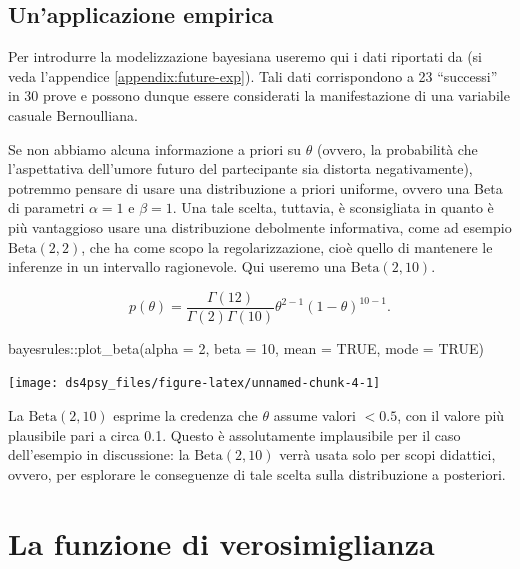 \documentclass[
  11pt,
]{krantz}
\makeatletter
\newenvironment{Shaded}{\begin{snugshade}}{\end{snugshade}}
\newcommand{\AttributeTok}[1]{\textcolor[rgb]{0.61,0.61,0.61}{#1}}
\newcommand{\ConstantTok}[1]{\textcolor[rgb]{0,0,0}{#1}}
\newcommand{\DecValTok}[1]{\textcolor[rgb]{0.06,0.06,0.06}{#1}}
\newcommand{\FunctionTok}[1]{\textcolor[rgb]{0,0,0}{#1}}
\newcommand{\NormalTok}[1]{#1}
\newcommand{\SpecialCharTok}[1]{\textcolor[rgb]{0,0,0}{#1}}
\newenvironment{kframe}{%
\medskip{}
\setlength{\fboxsep}{.8em}
 \def\at@end@of@kframe{}%
 \ifinner\ifhmode%
  \def\at@end@of@kframe{\end{minipage}}%
  \begin{minipage}{\columnwidth}%
 \fi\fi%
 \def\FrameCommand##1{\hskip\@totalleftmargin \hskip-\fboxsep
 \colorbox{shadecolor}{##1}\hskip-\fboxsep
     \hskip-\linewidth \hskip-\@totalleftmargin \hskip\columnwidth}%
 \MakeFramed {\advance\hsize-\width
   \@totalleftmargin\z@ \linewidth\hsize
   \@setminipage}}%
 {\par\unskip\endMakeFramed%
 \at@end@of@kframe}
\renewenvironment{Shaded}{\begin{kframe}}{\end{kframe}}
\theoremstyle{definition}
\theoremstyle{definition}
\theoremstyle{definition}
\theoremstyle{definition}
\theoremstyle{remark}
\makeatother
\begin{document}
\hypertarget{unapplicazione-empirica}{%
\subsection{Un'applicazione empirica}\label{unapplicazione-empirica}}

Per introdurre la modelizzazione bayesiana useremo qui i dati riportati da \citet{zetschefuture2019} (si veda l'appendice \ref{appendix:future-exp}). Tali dati corrispondono a 23 ``successi'' in 30 prove e possono dunque essere considerati la manifestazione di una variabile casuale Bernoulliana.

Se non abbiamo alcuna informazione a priori su \(\theta\) (ovvero, la probabilità che l'aspettativa dell'umore futuro del partecipante sia distorta negativamente), potremmo pensare di usare una distribuzione a priori uniforme, ovvero una Beta di parametri \(\alpha=1\) e \(\beta=1\). Una tale scelta, tuttavia, è sconsigliata in quanto è più vantaggioso usare una distribuzione debolmente informativa, come ad esempio \(\mbox{Beta}(2, 2)\), che ha come scopo la regolarizzazione, cioè quello di mantenere le inferenze in un intervallo ragionevole. Qui useremo una \(\mbox{Beta}(2, 10)\).

\[
p(\theta) = \frac{\Gamma(12)}{\Gamma(2)\Gamma(10)}\theta^{2-1} (1-\theta)^{10-1}.
\]

\begin{Shaded}
\begin{Highlighting}[]
\NormalTok{bayesrules}\SpecialCharTok{::}\FunctionTok{plot\_beta}\NormalTok{(}\AttributeTok{alpha =} \DecValTok{2}\NormalTok{, }\AttributeTok{beta =} \DecValTok{10}\NormalTok{, }\AttributeTok{mean =} \ConstantTok{TRUE}\NormalTok{, }\AttributeTok{mode =} \ConstantTok{TRUE}\NormalTok{)}
\end{Highlighting}
\end{Shaded}

\begin{center}\texttt{[image: ds4psy\_files/figure-latex/unnamed-chunk-4-1]} \end{center}

La \(\mbox{Beta}(2, 10)\) esprime la credenza che \(\theta\) assume valori \(< 0.5\), con il valore più plausibile pari a circa 0.1. Questo è assolutamente implausibile per il caso dell'esempio in discussione: la \(\mbox{Beta}(2, 10)\) verrà usata solo per scopi didattici, ovvero, per esplorare le conseguenze di tale scelta sulla distribuzione a posteriori.

\hypertarget{la-funzione-di-verosimiglianza}{%
\section{La funzione di verosimiglianza}\label{la-funzione-di-verosimiglianza}}
\end{document}
